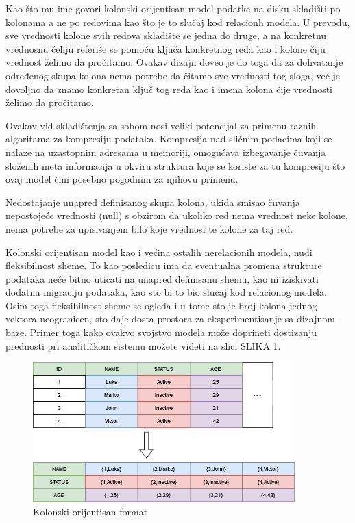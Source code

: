 \documentclass[12pt,oneside]{memoir}
\begin{document}
Kao što mu ime govori kolonski orijentisan model podatke na disku skladišti po kolonama a ne po redovima kao što je to slučaj kod relacionh modela. U prevodu, sve vrednosti kolone svih redova skladište se jedna do druge, a na konkretnu vrednosnu ćeliju referiše se pomoću ključa konkretnog reda kao i kolone čiju vrednost želimo da pročitamo. Ovakav dizajn doveo je do toga da za dohvatanje određenog skupa kolona nema potrebe da čitamo sve vrednosti tog sloga, već je dovoljno da znamo konkretan ključ tog reda kao i imena kolona čije vrednosti želimo da pročitamo.

Ovakav vid skladištenja sa sobom nosi veliki potencijal za primenu raznih algoritama za kompresiju podataka.  Kompresija nad sličnim podacima koji se nalaze na uzastopnim adresama u memoriji, omogućava izbegavanje čuvanja složenih meta informacija u okviru struktura koje se koriste za tu kompresiju što ovaj model čini posebno pogodnim za njihovu primenu.

Nedostajanje unapred definisanog skupa kolona, ukida smisao čuvanja nepostojeće vrednosti (null) s obzirom da ukoliko  red nema vrednost neke kolone, nema potrebe za upisivanjem bilo koje vrednosi te kolone za taj red.

Kolonski orijentisan model kao i većina ostalih nerelacionih modela, nudi fleksibilnost sheme. To kao posledicu ima da eventualna promena strukture podataka neće bitno uticati na unapred definisanu shemu, kao ni iziskivati dodatnu migraciju podataka, kao sto bi to bio slucaj kod relacionog modela. Osim toga fleksibilnost sheme se ogleda i u tome sto je broj kolona jednog vektora neogranicen, sto daje dosta prostora za eksperimentisanje sa dizajnom baze. Primer toga kako ovakvo svojstvo modela može doprineti dostizanju prednosti pri analitičkom sistemu možete videti na slici SLIKA 1. 
\begin{figure}[!ht]
  \vspace*{4cm}
  \centering
  \includegraphics[width=0.9\textwidth]{relational-column-oriented.png}
  \caption{Kolonski orijentisan format}
  \label{fig:grafikon}
\end{figure}
\end{document}

